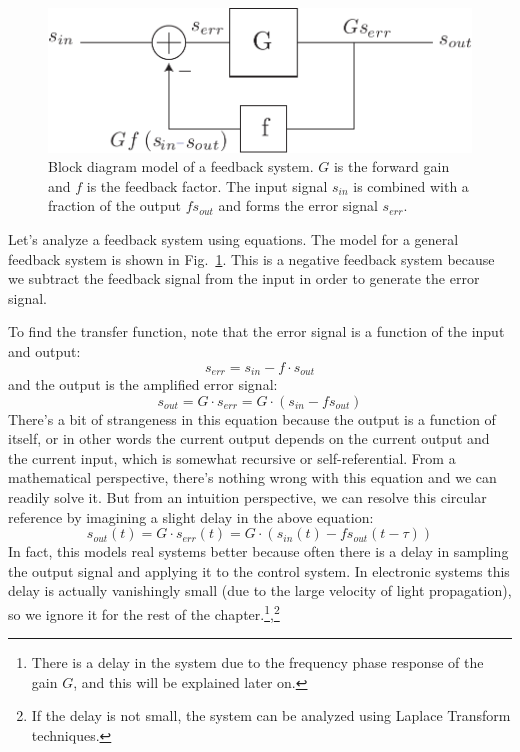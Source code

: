 \begin{figure}[tb]
\begin{center}
\includegraphics[scale=.7]{fbblock2}
\end{center}
\caption{Block diagram model of a feedback system.  $G$ is the forward gain and $f$ is the feedback factor.  The input signal $s_{in}$ is combined with a fraction of the output $f s_{out}$ and forms the error signal $s_{err}$.} \label{fig:fbblock2}
\end{figure}

Let's analyze a feedback system using equations.  The model for a general feedback system is shown in Fig.~\ref{fig:fbblock2}.  This is a negative feedback system because we subtract the feedback signal from the input in order to generate the error signal.

To find the transfer function, note that the error signal is a function of the input and output:
%
\begin{equation}
	{s_{err}} = {s_{in}} - f \cdot {s_{out}}
\end{equation}
%
and the output is the amplified error signal:
%
\begin{equation}
	{s_{out}} = G \cdot {s_{err}} = G \cdot ({s_{in}} - f{s_{out}})
\end{equation}
%
There's a bit of strangeness in this equation because the output is a function of itself, or in other words the current output depends on the current output and the current input, which is somewhat recursive or self-referential.  From a mathematical perspective, there's nothing wrong with this equation and we can readily solve it.  But from an intuition perspective, we can resolve this circular reference by imagining a slight delay in the above equation:
%
\begin{equation}
	{s_{out}(t)} = G \cdot {s_{err}(t) } = G \cdot ({s_{in}(t)} - f{s_{out}(t-\tau)})
\end{equation}
%
In fact, this models real systems better because often there is a delay in sampling the output signal and applying it to the control system.  In electronic systems this delay is actually vanishingly small (due to the large velocity of light propagation), so we ignore it for the rest of the chapter.\footnote{There is a delay in the system due to the frequency phase response of the gain $G$, and this will be explained later on.},\footnote{If the delay is not small, the system can be analyzed using Laplace Transform techniques.}  

